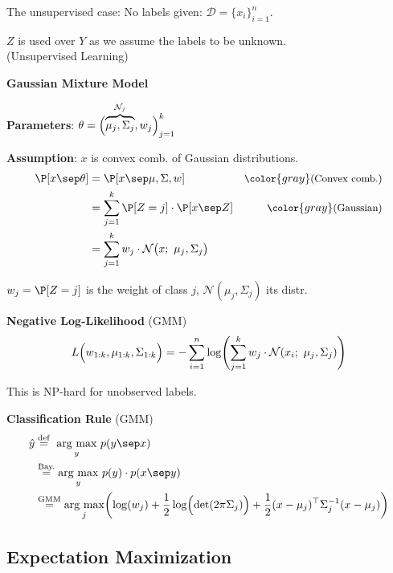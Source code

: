 The unsupervised case: No labels given: $\mathcal{D}=\{x_i\}_{i=1}^n$.

{\footnotesize
    \notation $Z$ is used over $Y$ as we assume the labels to be unknown.\\
    \color{gray} (Unsupervised Learning)
}

 \textbf{Gaussian Mixture Model}


\textbf{Parameters}: $\theta = \Bigl(\overbrace{\mu_j, \Sigma_j}^{\mathcal{N}_j}, w_j\Bigr)_{j=1}^k$

\textbf{Assumption}: $x$ is convex comb. of Gaussian distributions.\\
\begin{align*}
    \P[x\sep\theta] &= \P[x \sep \mu,\Sigma,w]                                              & \small\color{gray}\text{(Convex comb.)} \\
                    &= \sum_{j=1}^k \P[Z=j]\cdot\P[x\sep Z]                                 & \small\color{gray}\text{(Gaussian)}     \\
                    &= \sum_{j=1}^k w_j \cdot \mathcal{N}\bigl( x;\ \mu_j,\Sigma_j \bigr)
\end{align*}

$w_j = \P[Z=j]$ is the weight of class $j$, $\mathcal{N}(\mu_j,\Sigma_j)$ its distr.\\ 

\lemma \textbf{Negative Log-Likelihood} (GMM)
$$
    L\Bigl( w_{1:k},\mu_{1:k},\Sigma_{1:k} \Bigr) = -\sum_{i=1}^n \log\Biggl( \sum_{j=1}^k w_j\cdot\mathcal{N}(x_i;\ \mu_j,\Sigma_j) \Biggr)
$$

\remark This is NP-hard for unobserved labels.\\ 

\lemma \textbf{Classification Rule} (GMM)
{\small
\begin{align*}
    \hat{y} &\overset{\text{def}}{=}\ \underset{y}{\text{arg max}}\ p(y\sep x) \\
            &\overset{\text{Bay.}}{=} \underset{y}{\text{arg max}}\ p(y)\cdot p(x\sep y)\\ 
            &\overset{\text{GMM}}{=} \underset{j}{\text{arg max}}\biggl( \log(w_j) + \frac{1}{2}\log\Bigl( \det(2\pi\Sigma_j) \Bigr) + \frac{1}{2}(x-\mu_j)^\top \Sigma_j^{-1} (x-\mu_j) \biggr)
\end{align*}
}

\newpage
\subsection{Expectation Maximization}

